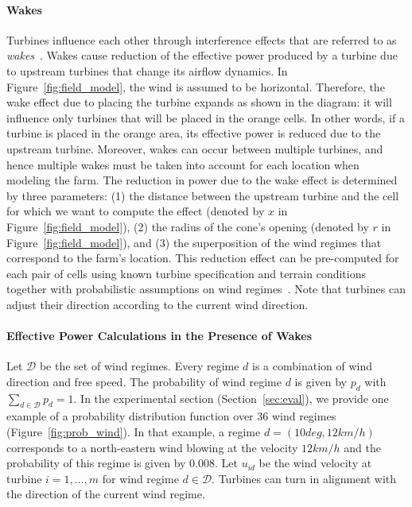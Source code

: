 \documentclass[preprint,12pt]{elsarticle}
\begin{document}
\paragraph{Wakes} Turbines influence each other through interference effects that are referred to as \emph{wakes}~\cite{jensen1983note,shakoor2016wake}. 
	 Wakes cause reduction of the effective power produced by a turbine due to upstream turbines that change
	 its airflow dynamics. In Figure~\ref{fig:field_model}, the wind is assumed to be horizontal. Therefore, the wake effect due
	 to placing the turbine expands as shown in the diagram: it will influence only turbines that will be placed in the orange cells.
	 In other words, if a turbine is placed in the orange area, its effective
	 power is reduced due to the upstream turbine. Moreover, wakes can occur between multiple turbines, and hence
	 multiple wakes must be taken into account for each location when modeling the farm. 
	 The reduction in power due to the wake effect is determined by three parameters: (1) the distance between the upstream
	 turbine and the cell for which we want to compute the effect (denoted by $x$ in Figure~\ref{fig:field_model}), (2) the radius of the cone's opening 
	 (denoted by $r$ in Figure~\ref{fig:field_model}), and (3) 
	 the superposition of the wind regimes that correspond to the farm's location.
	 This reduction effect can be pre-computed for each pair of cells using known
	 turbine specification and terrain conditions together with probabilistic assumptions on wind regimes~\cite{Zhang2014}. Note that turbines can adjust their direction according to the current wind direction. 
	 
\paragraph{Effective Power Calculations in the Presence of Wakes} 
Let $\mathcal{D}$ be the set of wind regimes. Every regime $d$ is a combination of wind direction and free speed. 
The probability of wind regime 
$d$ is given by $p_d$ with $\sum_{d \in \mathcal{D}}^{} p_d = 1$. In the experimental section (Section~\ref{sec:eval}),
we provide one example of a probability distribution 
function over $36$ wind regimes (Figure~\ref{fig:prob_wind}). In that example, 
a regime $d=(10deg, 12km/h)$ corresponds to a north-eastern wind blowing at the velocity $12km/h$ and the
probability of this regime is given by $0.008$. Let $u_{id}$ be the wind velocity at turbine $i = 1,\ldots, m$ for wind regime $d\in\mathcal{D}$. Turbines can turn in alignment with the direction of the current wind regime. 
\end{document}
